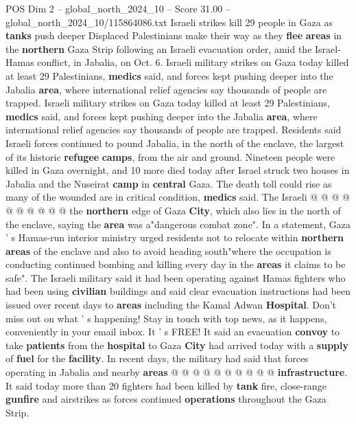 \begin{textsample}{POS Dim 2 – global\_north\_2024\_10 – Score 31.00 – global\_north\_2024\_10/115864086.txt}  \label{ex:f2_pos_343}
Israeli strikes kill 29 people in Gaza as \textbf{tanks} push deeper Displaced Palestinians make their way as they \textbf{flee} \textbf{areas} in the \textbf{northern} Gaza Strip following an Israeli evacuation order, amid the Israel-Hamas conflict, in Jabalia, on Oct. 6.
Israeli military strikes on Gaza today killed at least 29 Palestinians, \textbf{medics} said, and forces kept pushing deeper into the Jabalia \textbf{area}, where international relief agencies say thousands of people are trapped.
Israeli military strikes on Gaza today killed at least 29 Palestinians, \textbf{medics} said, and forces kept pushing deeper into the Jabalia \textbf{area}, where international relief agencies say thousands of people are trapped.
Residents said Israeli forces continued to pound Jabalia, in the north of the enclave, the largest of its historic \textbf{refugee} \textbf{camps}, from the air and ground.
Nineteen people were killed in Gaza overnight, and 10 more died today after Israel struck two houses in Jabalia and the Nuseirat \textbf{camp} in \textbf{central} Gaza.
The death toll could rise as many of the wounded are in critical condition, \textbf{medics} said.
The Israeli @ @ @ @ @ @ @ @ @ @ the \textbf{northern} edge of Gaza \textbf{City}, which also lies in the north of the enclave, saying the \textbf{area} was a"dangerous combat zone".
In a statement, Gaza ' s Hamas-run interior ministry urged residents not to relocate within \textbf{northern} \textbf{areas} of the enclave and also to avoid heading south"where the occupation is conducting continued bombing and killing every day in the \textbf{areas} it claims to be safe".
The Israeli military said it had been operating against Hamas fighters who had been using \textbf{civilian} buildings and said clear evacuation instructions had been issued over recent days to \textbf{areas} including the Kamal Adwan \textbf{Hospital}.
Don't miss out on what ' s happening!
Stay in touch with top news, as it happens, conveniently in your email inbox.
It ' s FREE!
It said an evacuation \textbf{convoy} to take \textbf{patients} from the \textbf{hospital} to Gaza \textbf{City} had arrived today with a \textbf{supply} of \textbf{fuel} for the \textbf{facility}.
In recent days, the military had said that forces operating in Jabalia and nearby \textbf{areas} @ @ @ @ @ @ @ @ @ @ \textbf{infrastructure}.
It said today more than 20 fighters had been killed by \textbf{tank} fire, close-range \textbf{gunfire} and airstrikes as forces continued \textbf{operations} throughout the Gaza Strip.

\end{textsample}
